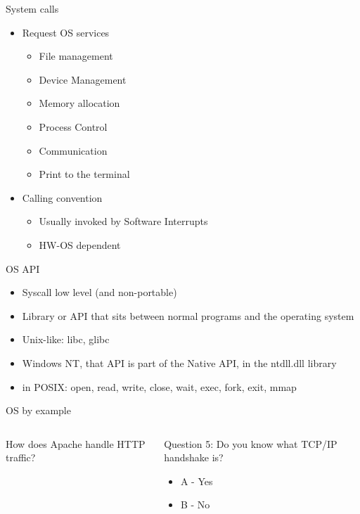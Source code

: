 \documentclass{beamer}
\begin{document}
\begin{frame}{System calls}
    \begin{itemize}
      \item Request OS services
    \begin{itemize}
      \item File management
      \item Device Management
      \item Memory allocation
      \item Process Control
      \item Communication
      \item Print to the terminal
   \end{itemize}
   \item Calling convention
    \begin{itemize}
    \item Usually invoked by Software Interrupts
    \item HW-OS dependent
   \end{itemize}
   \end{itemize}
\end{frame}

\begin{frame}{OS API}
    \begin{itemize}
    \item Syscall low level (and non-portable)
    \item Library or API that sits between normal programs and the
      operating system 
    \item Unix-like: libc, glibc
    \item Windows NT, that API is part of the Native API, in the
      ntdll.dll library
    \item in POSIX: open, read, write, close, wait, exec, fork, exit, mmap
    \end{itemize}
\end{frame}


\begin{frame}[t]{OS by example}
\begin{columns}
\begin{column}[t]{0.5\textwidth}
  How does Apache handle HTTP traffic?\\
\end{column}
\begin{column}[t]{0.5\textwidth}
  Question 5: Do you know what TCP/IP handshake is?
  \begin{itemize}
    \item A - Yes
    \item B - No
  \end{itemize}
\end{column}
\end{columns}
\end{frame}
\end{document}

